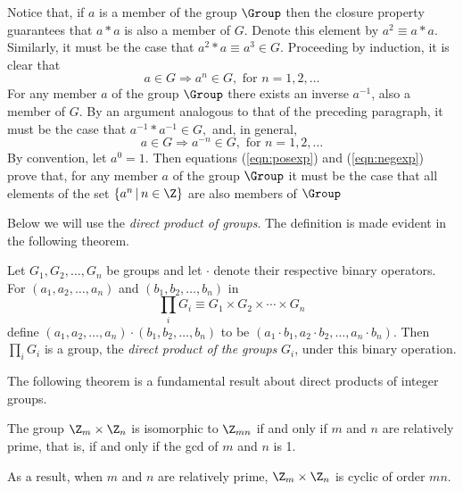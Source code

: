Notice that, if $a$ is a member of the group $\Group$
then the closure property guarantees that $a*a$ is also a member of
$G.$  Denote this element by $a^2 \equiv a*a.$  Similarly, it must be
the case that $a^2 * a \equiv a^3 \in G.$  Proceeding by induction, it
is clear that
\begin{equation}
\label{eqn:posexp}
a\in G \Rightarrow a^n \in G, \mbox{ for } n=1,2,\ldots
\end{equation}
For any member $a$ of the group $\Group$
there exists an inverse $a^{-1}$, also a member of $G.$  By an
argument analogous to that of the preceding paragraph, it must be the
case that $a^{-1}*a^{-1} \in G,$ and, in general,
\begin{equation}
\label{eqn:negexp}
a\in G \Rightarrow a^{-n} \in G, \mbox{ for } n=1,2,\ldots 
\end{equation}
By convention, let $a^0 = 1.$  Then equations
(\ref{eqn:posexp}) and (\ref{eqn:negexp}) prove that, for any
member $a$ of the group $\Group$
it must be the case that all elements of the set 
$\{a^n \,|\, n \in \Z\}$ are also members of $\Group$

Below we will use the \emph{direct product of groups}.  The definition
is made evident in the following theorem.
\begin{theorem}
Let $G_1, G_2, \ldots, G_n$ be groups and let $\cdot$ denote their
respective binary operators. For
$(a_1,a_2,\ldots,a_n)$ 
and 
$(b_1,b_2,\ldots,b_n)$ 
in
\[\prod_i G_i \equiv G_1 \times G_2 \times \cdots \times G_n \]
define 
$(a_1,a_2,\ldots,a_n)\cdot (b_1,b_2,\ldots,b_n) $ to be
$(a_1\cdot b_1,a_2\cdot b_2,\ldots,a_n\cdot b_n)$.  
Then $\prod_i G_i$ is a group, the \emph{direct product of the groups}
$G_i$, under this binary operation.
\end{theorem}
The following theorem is a fundamental result about direct products of integer
groups.
\begin{theorem}
\label{thm:cyclicProd}
The group $\Z_m \times \Z_n$ is isomorphic to
$\Z_{mn}$ if and only if $m$ and $n$ are relatively prime, 
that is, if and only if the gcd of $m$ and $n$ is 1.
\end{theorem}
As a result, when $m$ and $n$ are relatively prime, $\Z_m \times
\Z_n$ is cyclic of order $mn$.

